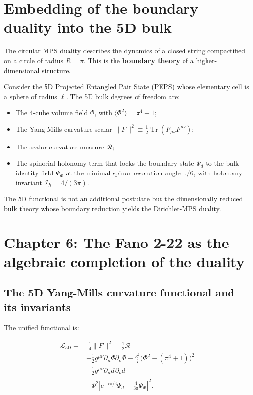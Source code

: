 \documentclass[12pt]{article}
\numberwithin{equation}{section}
\begin{document}
\newpage

\section*{Embedding of the boundary duality into the 5D bulk}

The circular MPS duality describes the dynamics of a closed string compactified on a circle of radius \(R=\pi\). This is the \textbf{boundary theory} of a higher-dimensional structure.

Consider the 5D Projected Entangled Pair State (PEPS) whose elementary cell is a sphere of radius \(\ell\). The 5D bulk degrees of freedom are:
\begin{itemize}
    \item The 4-cube volume field \(\Phi\), with \(\langle\Phi^2\rangle = \pi^4 + 1\);
    \item The Yang-Mills curvature scalar \(\|F\|^2 \equiv \frac{1}{2} \operatorname{Tr}(F_{\mu\nu} F^{\mu\nu})\);
    \item The scalar curvature measure \(\mathcal{R}\);
    \item The spinorial holonomy term that locks the boundary state \(\Psi_d\) to the bulk identity field \(\Psi_\Phi\) at the minimal spinor resolution angle \(\pi/6\), with holonomy invariant \(\mathcal{I}_h = 4/(3\pi)\).
\end{itemize}

The 5D functional is not an additional postulate but the dimensionally reduced bulk theory whose boundary reduction yields the Dirichlet-MPS duality.

\newpage

\section{Chapter 6: The Fano 2-22 as the algebraic completion of the duality}

\subsection{The 5D Yang-Mills curvature functional and its invariants}

The unified functional is:

\begin{equation}\label{eq:5dfunctional}
\boxed{
\begin{aligned}
\mathcal{L}_{\text{5D}} = &\;\frac{1}{4} \|F\|^2
+ \frac{1}{2}\mathcal{R} \\
&+ \frac{1}{2} g^{\mu\nu}\partial_\mu \Phi \partial_\nu \Phi - \frac{\kappa^2}{2}\bigl(\Phi^2 - (\pi^4+1)\bigr)^2 \\
&+ \frac{1}{2} g^{\mu\nu}\partial_\mu d \,\partial_\nu d \\
&+ \Phi^2 \left| e^{-i\pi/6} \Psi_d - \frac{4}{3\pi} \Psi_\Phi \right|^2 .
\end{aligned}
}
\end{equation}
\end{document}
